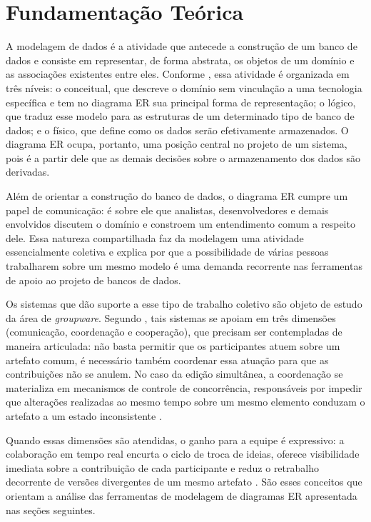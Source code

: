 \chapter{Fundamentação Teórica}

A modelagem de dados é a atividade que antecede a construção de um banco de dados e consiste em representar, de forma abstrata, os objetos de um domínio e as associações existentes entre eles. Conforme , essa atividade é organizada em três níveis: o conceitual, que descreve o domínio sem vinculação a uma tecnologia específica e tem no diagrama ER sua principal forma de representação; o lógico, que traduz esse modelo para as estruturas de um determinado tipo de banco de dados; e o físico, que define como os dados serão efetivamente armazenados. O diagrama ER ocupa, portanto, uma posição central no projeto de um sistema, pois é a partir dele que as demais decisões sobre o armazenamento dos dados são derivadas.

Além de orientar a construção do banco de dados, o diagrama ER cumpre um papel de comunicação: é sobre ele que analistas, desenvolvedores e demais envolvidos discutem o domínio e constroem um entendimento comum a respeito dele. Essa natureza compartilhada faz da modelagem uma atividade essencialmente coletiva e explica por que a possibilidade de várias pessoas trabalharem sobre um mesmo modelo é uma demanda recorrente nas ferramentas de apoio ao projeto de bancos de dados.

Os sistemas que dão suporte a esse tipo de trabalho coletivo são objeto de estudo da área de \textit{groupware}. Segundo , tais sistemas se apoiam em três dimensões (comunicação, coordenação e cooperação), que precisam ser contempladas de maneira articulada: não basta permitir que os participantes atuem sobre um artefato comum, é necessário também coordenar essa atuação para que as contribuições não se anulem. No caso da edição simultânea, a coordenação se materializa em mecanismos de controle de concorrência, responsáveis por impedir que alterações realizadas ao mesmo tempo sobre um mesmo elemento conduzam o artefato a um estado inconsistente \cite{Filippo2005}.

Quando essas dimensões são atendidas, o ganho para a equipe é expressivo: a colaboração em tempo real encurta o ciclo de troca de ideias, oferece visibilidade imediata sobre a contribuição de cada participante e reduz o retrabalho decorrente de versões divergentes de um mesmo artefato \cite{Inoue2014,Hsu2021}. São esses conceitos que orientam a análise das ferramentas de modelagem de diagramas ER apresentada nas seções seguintes.

